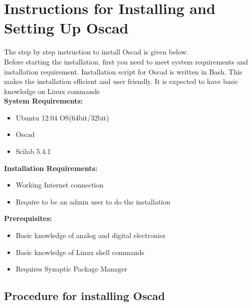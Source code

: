 
\chapter {Instructions for Installing and Setting Up Oscad}
The step by step instruction to install Oscad is given below.\\
Before starting the installation, first you need to meet system requirements and installation requirement. Installation script for Oscad is written in Bash.
This makes the installation efficient and user friendly. It is expected to have basic knowledge on Linux commands \\
\textbf{System Requirements:} \\
\begin{itemize}
\item Ubuntu 12.04 OS(64bit/32bit)
\item Oscad
\item Scilab 5.4.1
\end{itemize}
\textbf{Installation Requirements: }\\
\begin{itemize}
\item Working Internet connection
\item Require to be an admin user  to do the installation
\end{itemize}
\textbf{Prerequisites: }\\
\begin{itemize}
\item Basic knowledge of analog and digital electronics
\item Basic knowledge of Linux shell commands
\item Requires Synaptic Package Manager
\end{itemize}
\section {Procedure for installing Oscad}

